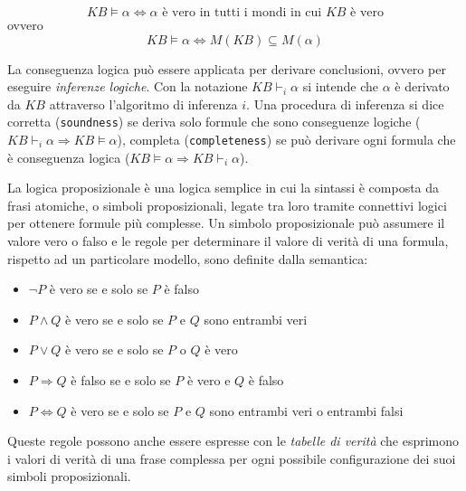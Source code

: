 		\begin{equation}
		KB\vDash\alpha \iff \alpha \mbox{ è vero in tutti i mondi in cui } KB \mbox{ è vero}
		\end{equation}
		ovvero
		\begin{equation}
		KB\vDash\alpha \iff M(KB)\subseteq M(\alpha)
		\end{equation}\par
		La conseguenza logica può essere applicata per derivare conclusioni, ovvero per eseguire \emph{inferenze logiche}. Con la notazione $KB\vdash_{i}\alpha$ si intende che $\alpha$ è derivato da $KB$ attraverso l'algoritmo di inferenza $i$. Una procedura di inferenza si dice corretta (\texttt{soundness}) se deriva solo formule che sono conseguenze logiche ($KB\vdash_{i}\alpha\Longrightarrow KB\vDash\alpha$), completa (\texttt{completeness}) se può derivare ogni formula che è conseguenza logica ($KB\vDash\alpha\Longrightarrow KB\vdash_{i}\alpha$).\par
		La logica proposizionale è una logica semplice in cui la sintassi è composta da frasi atomiche, o simboli proposizionali, legate tra loro tramite connettivi logici per ottenere formule più complesse. Un simbolo proposizionale può assumere il valore vero o falso e le regole per determinare il valore di verità di una formula, rispetto ad un particolare modello, sono definite dalla semantica: 
		\begin{itemize}
			\item $\neg P$ è vero se e solo se $P$ è falso
			\item $P\wedge Q$ è vero se e solo se $P$ e $Q$ sono entrambi veri
			\item $P\vee Q$ è vero se e solo se $P$ o $Q$ è vero
			\item $P\Rightarrow Q$ è falso se e solo se $P$ è vero e $Q$ è falso
			\item $P\Leftrightarrow Q$ è vero se e solo se $P$ e $Q$ sono entrambi veri o entrambi falsi
		\end{itemize}
		Queste regole possono anche essere espresse con le \emph{tabelle di verità} che esprimono i valori di verità di una frase complessa per ogni possibile configurazione dei suoi simboli proposizionali.\par
